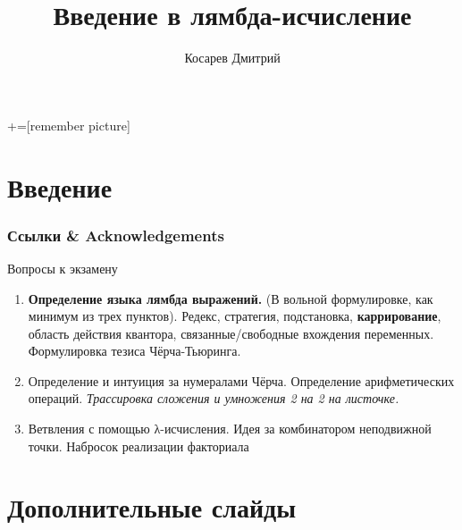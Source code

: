 \documentclass[aspectratio=169
  , xcolor={svgnames}
  , hyperref={colorlinks,citecolor=DeepPink4,linkcolor=DarkRed,urlcolor=DarkBlue}
  , russian  %
  ]{beamer}
\title[Введение в лямбда-исчисление]{Введение в лямбда-исчисление}
\author{Косарев Дмитрий}
\date{\DTMDate{2025-03-12}}
\begin{document}
\maketitle

+=[remember picture]

\everymath{\displaystyle}





\section*{Введение}


\begin{frame}%
\frametitle<presentation>{Ссылки \& Acknowledgements}
\vspace{-1.5em}
\printbibliography
\end{frame}


\begin{frame}{Вопросы к экзамену  }
\begin{enumerate}
	\item \textbf{Определение языка лямбда выражений.} (В вольной формулировке, как минимум из трех пунктов). Редекс, стратегия, подстановка, \textbf{каррирование}, область действия квантора, связанные/свободные вхождения переменных. Формулировка тезиса Чёрча-Тьюринга.
	\item Определение и интуиция за нумералами Чёрча. Определение арифметических операций. \textit{Трассировка сложения и умножения 2 на 2 на листочке.}
	\item Ветвления с помощью λ-исчисления. Идея за комбинатором неподвижной точки. Набросок реализации факториала

\end{enumerate}
\end{frame}



\section{Дополнительные слайды}




\end{document}
